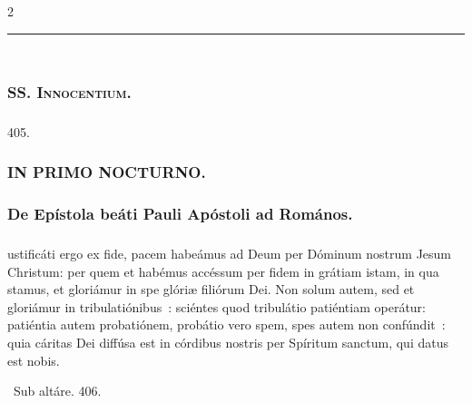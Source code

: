 \documentclass[9pt,twoside]{extarticle}
\begin{document}
\begin{multicols}{2}
\begin{center}\textcolor{red}{\rule{\linewidth}{0.5pt}} \end{center}

\subsection*{\center {}}
\subsubsection*{\center {}\\ \textsc{SS. Innocentium.}}
\subsubsection*{\center {}}

\begin{tightlist}{}
\item {} 405. 
\end{tightlist}

\subsubsection*{\center \textsc{IN PRIMO NOCTURNO.}}
\subsubsection*{\center De Epístola beáti Pauli Apóstoli ad Romános.}
\subsubsection*{\center {}}
ustificáti ergo ex fide, pacem habeámus ad Deum per Dóminum nostrum Jesum Christum:
per quem et habémus accéssum per fidem in grátiam istam, in qua stamus, et gloriámur in spe glóriæ filiórum Dei.
Non solum autem, sed et gloriámur in tribulatiónibus~: sciéntes quod tribulátio patiéntiam operátur:
patiéntia autem probatiónem, probátio vero spem,
spes autem non confúndit~: quia cáritas Dei diffúsa est in córdibus nostris per Spíritum sanctum, qui datus est nobis.

\begin{tightlist}{}
\item {}~Sub altáre. 406.
\end{tightlist}


\end{multicols}
\end{document}
